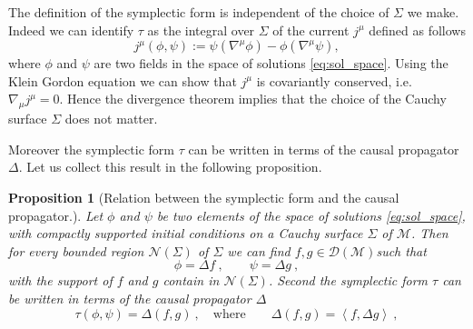\documentclass[11pt]{book}
\newcommand{\sm}[1]{\left\langle#1\right\rangle}
\newcommand{\Dcal}{\mathcal{D}}
\newcommand{\Mcal}{\mathcal{M}}
\newcommand{\Ncal}{\mathcal{N}}
\theoremstyle{break}
\newtheorem{proposition}{Proposition}[chapter]
\begin{document}
%
The definition of the symplectic form is independent of the choice of $\Sigma$ we make. Indeed we can identify $\tau$ as the integral over $\Sigma$ of the current $j^\mu$ defined as follows
%
\begin{equation*}
j^\mu (\phi,\psi) := \psi (\nabla^\mu \phi) - \phi (\nabla^\mu \psi),  
\label{eq:current}
\end{equation*}
%
where $\phi$ and $\psi$ are two fields in the space of solutions \eqref{eq:sol_space}. Using the Klein Gordon equation we can show that $j^\mu$ is covariantly conserved, i.e. $\nabla_\mu j^\mu = 0$. Hence the divergence theorem implies that the choice of the Cauchy surface $\Sigma$ does not matter. 


Moreover the symplectic form $\tau$ can be written in terms of the causal propagator $\Delta$. Let us collect this result in the following proposition.


\begin{proposition}[Relation between the symplectic form and the causal propagator.]
Let $\phi$ and $\psi$ be two elements of the space of solutions \eqref{eq:sol_space}, with compactly supported initial conditions on a Cauchy surface $\Sigma$ of $\Mcal$. Then for every bounded region $\Ncal(\Sigma)$ of $\Sigma$ we can find $f,g \in \Dcal(\Mcal)$such that
%
\begin{equation*}
\phi = \Delta f \ , \qquad  \psi   =  \Delta g \ ,
\end{equation*}
%
with the support of $f$ and $g$ contain in $\Ncal(\Sigma)$. Second the symplectic form $\tau$ can be written in terms of the causal propagator $\Delta$ 
%
\begin{equation*}
\tau(\phi,\psi) = \Delta(f,g) \ , \quad \mbox{where} \qquad \Delta(f,g) = \sm{f,\Delta g} \ ,
\end{equation*}
%
\end{proposition}
\end{document}
